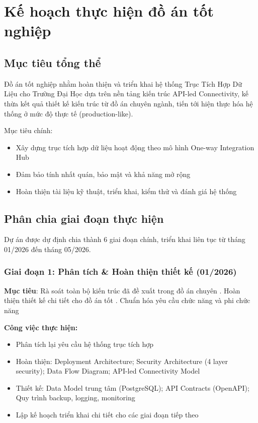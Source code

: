 \chapter{Kế hoạch thực hiện đồ án tốt nghiệp}

\section{Mục tiêu tổng thể}
Đồ án tốt nghiệp nhằm hoàn thiện và triển khai hệ thống Trục Tích Hợp Dữ Liệu cho Trường Đại Học dựa trên nền tảng kiến trúc API-led Connectivity, kế thừa kết quả thiết kế kiến trúc từ đồ án chuyên ngành, tiến tới hiện thực hóa hệ thống ở mức độ thực tế (production-like).

Mục tiêu chính:

\begin{itemize}
    \item Xây dựng trục tích hợp dữ liệu hoạt động theo mô hình One-way Integration Hub
    \item Đảm bảo tính nhất quán, bảo mật và khả năng mở rộng

    \item Hoàn thiện tài liệu kỹ thuật, triển khai, kiểm thử và đánh giá hệ thống
\end{itemize}

\section{Phân chia giai đoạn thực hiện}

Dự án được dự định chia thành 6 giai đoạn chính, triển khai liên tục từ tháng 01/2026 đến tháng 05/2026.


\subsection{Giai đoạn 1: Phân tích \& Hoàn thiện thiết kế (01/2026)}

\textbf{Mục tiêu}: Rà soát toàn bộ kiến trúc đã đề xuất trong đồ án chuyên . Hoàn thiện thiết kế chi tiết cho đồ án tốt . Chuẩn hóa yêu cầu chức năng và phi chức năng

\textbf{Công việc thực hiện:}
\begin{itemize}
    \item Phân tích lại yêu cầu hệ thống trục tích hợp
    \item Hoàn thiện: Deployment Architecture; Security Architecture (4 layer security); Data Flow Diagram; API-led Connectivity Model
    \item Thiết kế: Data Model trung tâm (PostgreSQL); API Contracts (OpenAPI); Quy trình backup, logging, monitoring
    \item  Lập kế hoạch triển khai chi tiết cho các giai đoạn tiếp theo
\end{itemize}

